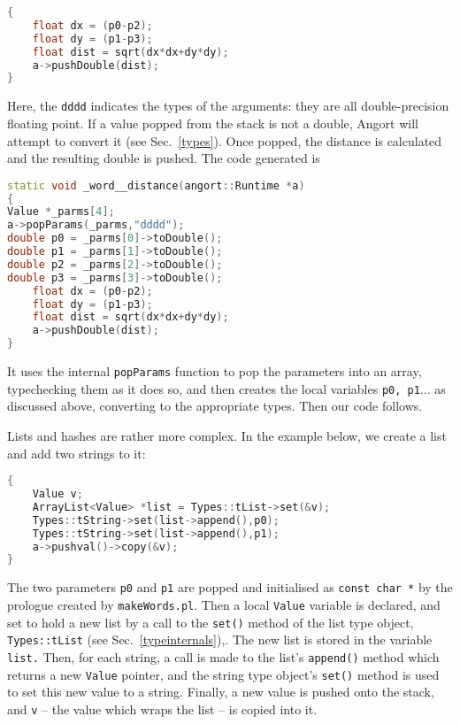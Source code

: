 \begin{lstlisting}[language=c++]
%wordargs distance dddd (x1 y1 x2 y2 -- dist)
{
    float dx = (p0-p2);
    float dy = (p1-p3);
    float dist = sqrt(dx*dx+dy*dy);
    a->pushDouble(dist);
}
\end{lstlisting}
Here, the \texttt{dddd} indicates the types of the arguments: they
are all double-precision floating point.
If a value popped from the stack is not a double,
Angort will attempt to convert it (see Sec.~\ref{types}).
Once popped, the distance is calculated and the resulting double
is pushed. The code generated is
\begin{lstlisting}[language=c++]
static void _word__distance(angort::Runtime *a)
{
Value *_parms[4];
a->popParams(_parms,"dddd");
double p0 = _parms[0]->toDouble();
double p1 = _parms[1]->toDouble();
double p2 = _parms[2]->toDouble();
double p3 = _parms[3]->toDouble();
    float dx = (p0-p2);
    float dy = (p1-p3);
    float dist = sqrt(dx*dx+dy*dy);
    a->pushDouble(dist);
}
\end{lstlisting}
It uses the internal \texttt{popParams} function to pop the parameters
into an array, typechecking them as it does so, and then creates the
local variables \texttt{p0, p1}... as discussed above, converting
to the appropriate types. Then our code follows.

Lists and hashes are rather more complex. In the example below,
we create a list and add two strings to it:
\begin{lstlisting}[language=c++]
%wordargs stringstolist ss (string string -- list) list from two strings
{
    Value v;
    ArrayList<Value> *list = Types::tList->set(&v);
    Types::tString->set(list->append(),p0);
    Types::tString->set(list->append(),p1);
    a->pushval()->copy(&v);
}
\end{lstlisting}
The two parameters \texttt{p0} and \texttt{p1} are popped and
initialised as \texttt{const char *} by the prologue created
by \texttt{makeWords.pl}. Then a local \texttt{Value} variable
is declared,
and set to hold a new list by a call to the \texttt{set()} method
of the list type object, \texttt{Types::tList} (see Sec.~\ref{typeinternals}),.
The new list is stored in the variable \texttt{list.} 
Then, for each string, a call is made to the list's \texttt{append()} method
which returns a new \texttt{Value} pointer, and the string type
object's \texttt{set()} method is used to set this new value to a string.
Finally, a new value is pushed onto the stack, and \texttt{v} -- the value
which wraps the list -- is copied into it.

